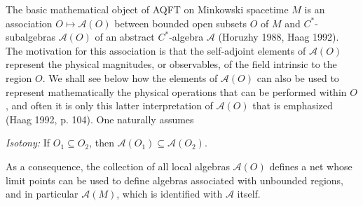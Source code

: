 \documentclass[12pt]{article}
\newcommand{\alg}[1]{\mbox{$\mathcal{#1}$}}
\begin{document}
The basic mathematical object of AQFT on 
Minkowski spacetime $M$ 
is an association 
$O\longmapsto \alg{A}(O)$
between bounded open subsets
$O$ of $M$ and $C^{*}$-subalgebras $\alg{A}(O)$ of 
an abstract $C^{*}$-algebra $\alg{A}$ 
(Horuzhy 1988, Haag 1992).
  The motivation for
this association is that the self-adjoint elements of 
$\alg{A}(O)$ represent the physical magnitudes, or observables, of 
the field intrinsic to the region $O$.  
We shall see below how the elements of $\alg{A}(O)$ can also be used to 
represent mathematically the physical operations that can be performed 
within $O$, 
and often it is only this latter 
interpretation of $\alg{A}(O)$ that is emphasized (Haag 1992, p. 104).  
One naturally assumes
\begin{center}  
\emph{Isotony:}  If $O_{1}\subseteq O_{2}$, then
$\alg{A}(O_{1})\subseteq
\alg{A}(O_{2})$.
\end{center}
  As a consequence, the collection of all local algebras 
  $\alg{A}(O)$ defines a net whose limit points can be used to define 
  algebras associated with unbounded regions, and in particular 
  $\alg{A}(M)$, which is identified with $\alg{A}$ itself.  
  
\end{document}
